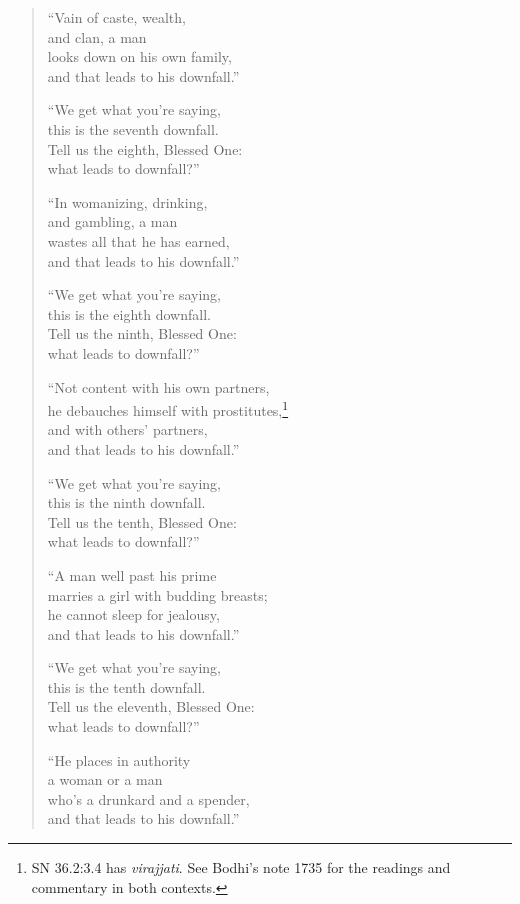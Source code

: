 \documentclass[12pt,openany]{book}%
\begin{document}
\begin{verse}
“Vain of caste, wealth, \\
and clan, a man \\
looks down on his own family, \\
and that leads to his downfall.” 

“We get what you’re saying, \\
this is the seventh downfall. \\
Tell us the eighth, Blessed One: \\
what leads to downfall?” 

“In womanizing, drinking, \\
and gambling, a man \\
wastes all that he has earned, \\
and that leads to his downfall.” 

“We get what you’re saying, \\
this is the eighth downfall. \\
Tell us the ninth, Blessed One: \\
what leads to downfall?” 

“Not content with his own partners, \\
he debauches himself with prostitutes,\footnote{SN 36.2:3.4 has \textit{virajjati}. See Bodhi’s note 1735 for the readings and commentary in both contexts. } \\
and with others’ partners, \\
and that leads to his downfall.” 

“We get what you’re saying, \\
this is the ninth downfall. \\
Tell us the tenth, Blessed One: \\
what leads to downfall?” 

“A man well past his prime \\
marries a girl with budding breasts; \\
he cannot sleep for jealousy, \\
and that leads to his downfall.” 

“We get what you’re saying, \\
this is the tenth downfall. \\
Tell us the eleventh, Blessed One: \\
what leads to downfall?” 

“He places in authority \\
a woman or a man \\
who’s a drunkard and a spender, \\
and that leads to his downfall.” 


\end{verse}
\end{document}
